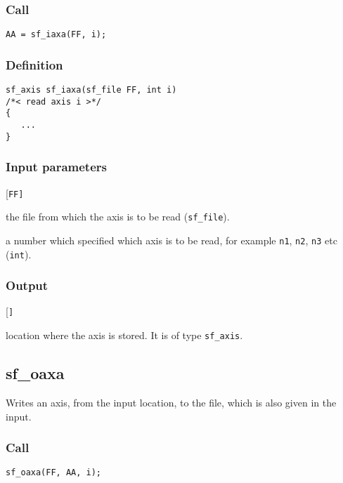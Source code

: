 \subsubsection*{Call}
\begin{verbatim}AA = sf_iaxa(FF, i);\end{verbatim}

\subsubsection*{Definition}
\begin{verbatim}
sf_axis sf_iaxa(sf_file FF, int i) 
/*< read axis i >*/
{
   ...
}
\end{verbatim}

\subsubsection{Input parameters}
\begin{desclist}{\tt }{\quad}[\tt FF]
   \setlength\itemsep{0pt}
   \item[FF] the file from which the axis is to be read (\texttt{sf\_file}).  
   \item[i]  a number which specified which axis is to be read, for example \texttt{n1}, \texttt{n2}, \texttt{n3} etc (\texttt{int}).  
\end{desclist}

\subsubsection*{Output}
\begin{desclist}{\tt }{\quad}[\tt ]
   \setlength\itemsep{0pt}  
   \item[AA] location where the axis is stored. It is of type \texttt{sf\_axis}.
\end{desclist}




\subsection{{sf\_oaxa}}\label{sec:sf_oaxa}
Writes an axis, from the input location, to the file, which is also given in the input.

\subsubsection*{Call}
\begin{verbatim}sf_oaxa(FF, AA, i);\end{verbatim}


